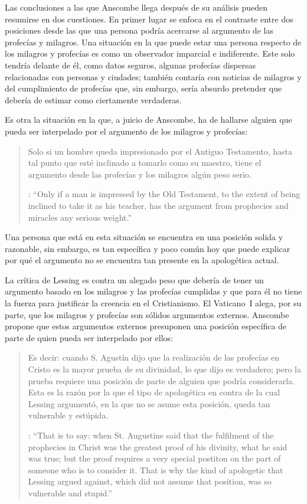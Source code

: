 Las conclusiones a las que Anscombe llega después de su análisis pueden resumirse en dos cuestiones. En primer lugar se enfoca en el contraste entre dos posiciones desde las que una persona podría acercarse al argumento de las profecías y milagros. Una situación en la que puede estar una persona respecto de los milagros y profecías es como un observador imparcial e indiferente. Este solo tendría delante de él, como datos seguros, algunas profecías dispersas relacionadas con personas y ciudades; también contaría con noticias de milagros y del cumplimiento de profecías que, sin embargo, sería absurdo pretender que debería de estimar como ciertamente verdaderas.

Es otra la situación en la que, a juicio de Anscombe, ha de hallarse alguien que pueda ser interpelado por el argumento de los milagros y profecías: \blockquote[{\cite[35]{anscombe2008faith:prophandmi}}: \enquote{Only if a man is impressed by the Old Testament, to the extent of being inclined to take it as his teacher, has the argument from prophecies and miracles any serious weight.}]{Solo si un hombre queda impresionado por el Antiguo Testamento, hasta tal punto que esté inclinado a tomarlo como su maestro, tiene el argumento desde las profecías y los milagros algún peso serio.} Una persona que está en esta situación se encuentra en una posición solida y razonable, sin embargo, es tan específica y poco común hoy que puede explicar por qué el argumento no se encuentra tan presente en la apologética actual.

La crítica de Lessing es contra un alegado peso que debería de tener un argumento basado en los milagros y las profecías cumplidas y que para él no tiene la fuerza para justificar la creencia en el Cristianismo. El Vaticano~I alega, por su parte, que los milagros y profecías son sólidos argumentos externos. Anscombe propone que estos argumentos externos presuponen una posición específica de parte de quien pueda ser interpelado por ellos: \blockquote[{\cite[37]{anscombe2008faith:prophandmi}}: \enquote{That is to say: when St. Augustine said that the fulfilment of the prophecies in Christ was the greatest proof of his divinity, what he said was true; but the proof requires a very special postiton on the part of someone who is to consider it. That is why the kind of apologetic that Lessing argued against, which did not assume that position, was so vulnerable and stupid.}]{Es decir: cuando S. Agustín dijo que la realización de las profecías en Cristo es la mayor prueba de su divinidad, lo que dijo es verdadero; pero la prueba requiere una posición de parte de alguien que podría considerarla. Esta es la razón por la que el tipo de apologética en contra de la cual Lessing argumentó, en la que no se asume esta posición, queda tan vulnerable y estúpida.}

